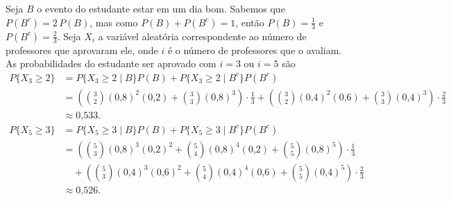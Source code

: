 \begin{questions}
\setcounter{question}{44}
\begin{solution}
	Seja $B$ o evento do estudante estar em um dia bom. Sabemos que $P(B^c) = 2\,P(B)$, mas como $P(B)+P(B^c) = 1$, então $P(B)=\frac{1}{3}$ e $P(B^c)=\frac{2}{3}$. Seja $X_i$ a variável aleatória correspondente ao número de professores que aprovaram ele, onde $i$ é o número de professores que o avaliam. As probabilidades do estudante ser aprovado com $i=3$ ou $i=5$ são
    \begin{align*}
    	P\{X_3\ge 2\} 
        	&= P\{X_3\ge 2\mid B\}P(B)+P\{X_3\ge 2\mid B^c\}P(B^c)\\
        	&= \left(\binom{3}{2}(\text{0,8})^2(\text{0,2})
            	+ \binom{3}{3}(\text{0,8})^3\right)\cdot\frac{1}{3}
                + \left(\binom{3}{2}(\text{0,4})^2(\text{0,6})
            	+ \binom{3}{3}(\text{0,4})^3\right)\cdot\frac{2}{3}\\
			&\approx \text{0,533}.\\[3mm]
		P\{X_5\ge 3\} 
         	&= P\{X_5\ge 3\mid B\}P(B)+P\{X_5\ge 3\mid B^c\}P(B^c)\\
        	&= \left(\binom{5}{3}(\text{0,8})^3(\text{0,2})^2
            	+ \binom{5}{4}(\text{0,8})^4(\text{0,2})
                + \binom{5}{5}(\text{0,8})^5\right)\cdot\frac{1}{3}\\
			&\quad + \left(\binom{5}{3}(\text{0,4})^3(\text{0,6})^2
            	+ \binom{5}{4}(\text{0,4})^4(\text{0,6})
                + \binom{5}{5}(\text{0,4})^5\right)\cdot\frac{2}{3}\\
			&\approx \text{0,526}.
    \end{align*}
\end{solution}


\end{questions}
